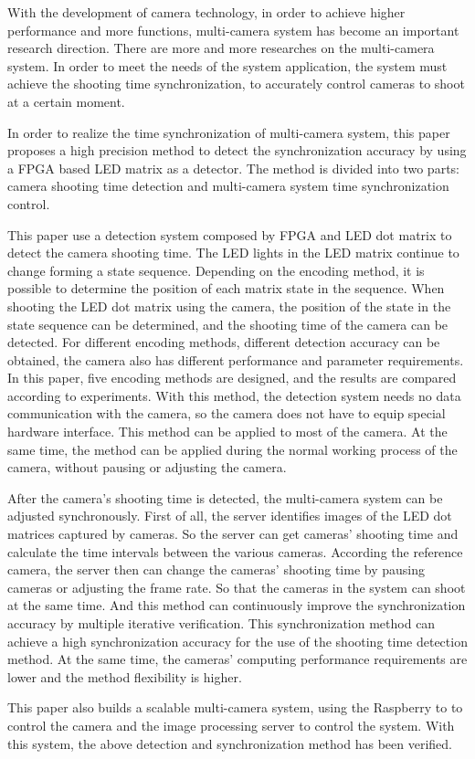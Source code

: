 
\begin{eabstract}

With the development of camera technology, in order to achieve higher performance and more functions, multi-camera system has become an important research direction. There are more and more researches on the multi-camera system. In order to meet the needs of the system application, the system must achieve the shooting time synchronization, to accurately control cameras to shoot at a certain moment.

In order to realize the time synchronization of multi-camera system, this paper proposes a high precision method to detect the synchronization accuracy by using a FPGA based LED matrix as a detector. The method is divided into two parts: camera shooting time detection and multi-camera system time synchronization control.

This paper use a detection system composed by FPGA and LED dot matrix to detect the camera shooting time. The LED lights in the LED matrix continue to change forming a state sequence. Depending on the encoding method, it is possible to determine the position of each matrix state in the sequence. When shooting the LED dot matrix using the camera, the position of the state in the state sequence can be determined, and the shooting time of the camera can be detected. For different encoding methods, different detection accuracy can be obtained, the camera also has different performance and parameter requirements. In this paper, five encoding methods are designed, and the results are compared according to experiments. With this method, the detection system needs no data communication with the camera, so the camera does not have to equip special hardware interface. This method can be applied to most of the camera. At the same time, the method can be applied during the normal working process of the camera, without pausing or adjusting the camera.

After the camera's shooting time is detected, the multi-camera system can be adjusted synchronously. First of all, the server identifies images of the LED dot matrices captured by cameras. So the server can get cameras' shooting time and calculate the time intervals between the various cameras. According the reference camera, the server then can change the cameras' shooting time by pausing cameras or adjusting the frame rate. So that the cameras in the system can shoot at the same time. And this method can continuously improve the synchronization accuracy by multiple iterative verification. This synchronization method can achieve a high synchronization accuracy for the use of the shooting time detection method. At the same time, the cameras' computing performance requirements are lower and the method flexibility is higher.

This paper also builds a scalable multi-camera system, using the Raspberry to to control the camera and the image processing server to control the system. With this system, the above detection and synchronization method has been verified.

\end{eabstract}

